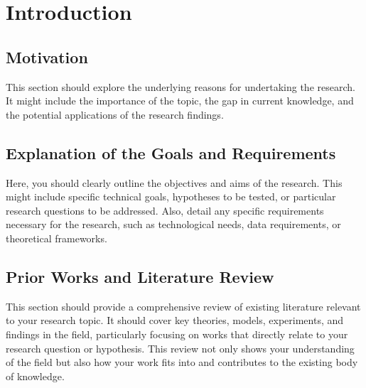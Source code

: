 \chapter{Introduction}

\graphicspath{{./Figures/Modeling}}



\section{Motivation}
This section should explore the underlying reasons for undertaking the research. It might include the importance of the topic, the gap in current knowledge, and the potential applications of the research findings.

\section{Explanation of the Goals and Requirements}
Here, you should clearly outline the objectives and aims of the research. This might include specific technical goals, hypotheses to be tested, or particular research questions to be addressed. Also, detail any specific requirements necessary for the research, such as technological needs, data requirements, or theoretical frameworks.

\section{Prior Works and Literature Review}
This section should provide a comprehensive review of existing literature relevant to your research topic. It should cover key theories, models, experiments, and findings in the field, particularly focusing on works that directly relate to your research question or hypothesis. This review not only shows your understanding of the field but also how your work fits into and contributes to the existing body of knowledge.
